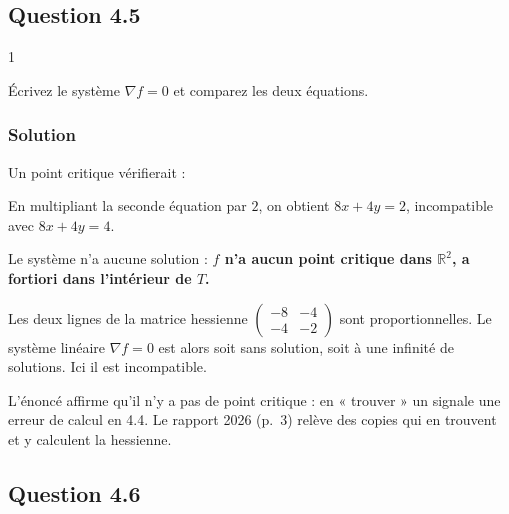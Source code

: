 \documentclass[11pt,a4paper]{article}
\newcommand{\equationajustee}[1]{%
  \sbox{\boiteequation}{$\displaystyle #1$}%
  \ifdim\wd\boiteequation>\linewidth
    \[\resizebox{\linewidth}{!}{\usebox{\boiteequation}}\]%
  \else
    \[#1\]%
  \fi}
\begin{document}
\hypertarget{question-4.5}{%
\subsection{Question 4.5}\label{question-4.5}}

\begin{indication}{1}

Écrivez le système \(\nabla f=0\) et comparez les deux équations.

\end{indication}

\hypertarget{solution-37}{%
\subsubsection{Solution}\label{solution-37}}

Un point critique vérifierait :

\equationajustee{\begin{cases}8x+4y=4\\4x+2y=1\end{cases}}

En multipliant la seconde équation par \(2\), on obtient \(8x+4y=2\), incompatible avec \(8x+4y=4\).

Le système n'a aucune solution : \textbf{\(f\) n'a aucun point critique dans \(\mathbb R^2\), a fortiori dans l'intérieur de \(T\).}

\begin{methode}

Les deux lignes de la matrice hessienne \(\begin{pmatrix}-8&-4\\-4&-2\end{pmatrix}\) sont proportionnelles. Le système linéaire \(\nabla f=0\) est alors soit sans solution, soit à une infinité de solutions. Ici il est incompatible.

\end{methode}

\begin{piege}

L'énoncé affirme qu'il n'y a pas de point critique : en « trouver » un signale une erreur de calcul en 4.4. Le rapport 2026 (p.~3) relève des copies qui en trouvent et y calculent la hessienne.

\end{piege}

\hypertarget{question-4.6}{%
\subsection{Question 4.6}\label{question-4.6}}
\end{document}
